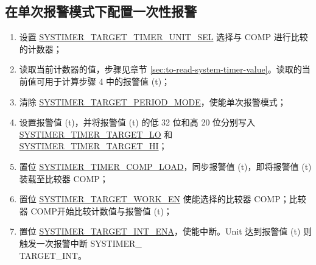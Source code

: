 \documentclass[main\_\_CN.tex]{subfiles}
\begin{document}
\subsection{在单次报警模式下配置一次性报警}
\begin{enumerate}
    \item 设置 \hyperref[fielddesc:SYSTIMERTARGET0TIMERUNITSEL]{SYSTIMER\_TARGET\_TIMER\_UNIT\_SEL} 选择与 COMP 进行比较的计数器；
    \item 读取当前计数器的值，步骤见章节  \ref{sec:to-read-system-timer-value}。读取的当前值可用于计算步骤 4 中的报警值 (t)；
    \item 清除 \hyperref[fielddesc:SYSTIMERTARGET0PERIODMODE]{SYSTIMER\_TARGET\_PERIOD\_MODE}，使能单次报警模式；
    \item 设置报警值 (t)，并将报警值 (t) 的低 32 位和高 20 位分别写入   \hyperref[fielddesc:SYSTIMERTIMERTARGET0LO]{SYSTIMER\_TIMER\_TARGET\_LO} 和 \hyperref[fielddesc:SYSTIMERTIMERTARGET0HI]{SYSTIMER\_TIMER\_TARGET\_HI}；
    \item 置位 \hyperref[fielddesc:SYSTIMERTIMERCOMP0LOAD]{SYSTIMER\_TIMER\_COMP\_LOAD}，同步报警值 (t)，即将报警值 (t) 装载至比较器 COMP；
    \item 置位 \hyperref[fielddesc:SYSTIMERTARGET0WORKEN]{SYSTIMER\_TARGET\_WORK\_EN} 使能选择的比较器 COMP；比较器 COMP\regindex{}开始比较计数值与报警值 (t)；
    \item 置位 \hyperref[fielddesc:SYSTIMERTARGET0INTENA]{SYSTIMER\_TARGET\_INT\_ENA}，使能中断。Unit 达到报警值 (t) 则触发一次报警中断 SYSTIMER\_\\TARGET{}\_INT。
\end{enumerate}
\end{document}
